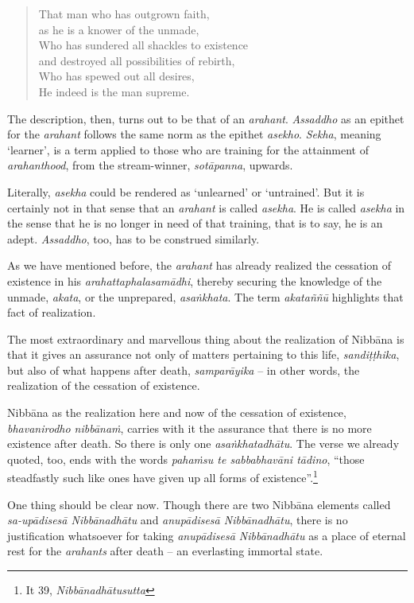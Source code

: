 \begin{quote}
That man who has outgrown faith,\\
\vin as he is a knower of the unmade,\\
Who has sundered all shackles to existence\\
\vin and destroyed all possibilities of rebirth,\\
Who has spewed out all desires,\\
He indeed is the man supreme.
\end{quote}

The description, then, turns out to be that of an \emph{arahant}. \emph{Assaddho} as an epithet for the \emph{arahant} follows the same norm as the epithet \emph{asekho}. \emph{Sekha}, meaning `learner', is a term applied to those who are training for the attainment of \emph{arahanthood}, from the stream-winner, \emph{sotāpanna}, upwards.

Literally, \emph{asekha} could be rendered as `unlearned' or `untrained'. But it is certainly not in that sense that an \emph{arahant} is called \emph{asekha}. He is called \emph{asekha} in the sense that he is no longer in need of that training, that is to say, he is an adept. \emph{Assaddho}, too, has to be construed similarly.

As we have mentioned before, the \emph{arahant} has already realized the cessation of existence in his \emph{arahattaphalasamādhi}, thereby securing the knowledge of the unmade, \emph{akata}, or the unprepared, \emph{asaṅkhata}. The term \emph{akataññū} highlights that fact of realization.

The most extraordinary and marvellous thing about the realization of Nibbāna is that it gives an assurance not only of matters pertaining to this life, \emph{sandiṭṭhika}, but also of what happens after death, \emph{samparāyika} -- in other words, the realization of the cessation of existence.

Nibbāna as the realization here and now of the cessation of existence, \emph{bhavanirodho nibbānaṁ}, carries with it the assurance that there is no more existence after death. So there is only one \emph{asaṅkhatadhātu}. The verse we already quoted, too, ends with the words \emph{pahaṁsu te sabbabhavāni tādino}, ``those steadfastly such like ones have given up all forms of existence''.\footnote{It 39, \emph{Nibbānadhātusutta}}

One thing should be clear now. Though there are two Nibbāna elements called \emph{sa-upādisesā Nibbānadhātu} and \emph{anupādisesā Nibbānadhātu}, there is no justification whatsoever for taking \emph{anupādisesā Nibbānadhātu} as a place of eternal rest for the \emph{arahants} after death -- an everlasting immortal state.

